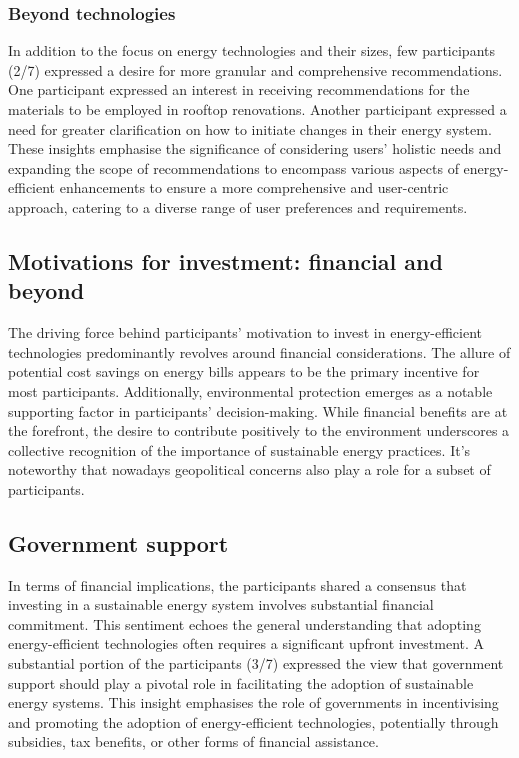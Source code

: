 \subsubsection*{Beyond technologies}

In addition to the focus on energy technologies and their sizes, few participants (2/7) expressed a desire for more granular and comprehensive recommendations. 
One participant expressed an interest in receiving recommendations for the materials to be employed in rooftop renovations. 
Another participant expressed a need for greater clarification on how to initiate changes in their energy system. 
These insights emphasise the significance of considering users' holistic needs and expanding the scope of recommendations to encompass various aspects of energy-efficient enhancements to ensure a more comprehensive and user-centric approach, catering to a diverse range of user preferences and requirements.


\subsection*{Motivations for investment: financial and beyond}

The driving force behind participants' motivation to invest in energy-efficient technologies predominantly revolves around financial considerations. 
The allure of potential cost savings on energy bills appears to be the primary incentive for most participants. 
Additionally, environmental protection emerges as a notable supporting factor in participants' decision-making. 
While financial benefits are at the forefront, the desire to contribute positively to the environment underscores a collective recognition of the importance of sustainable energy practices.
It's noteworthy that nowadays geopolitical concerns also play a role for a subset of participants. 


\subsection*{Government support}

In terms of financial implications, the participants shared a consensus that investing in a sustainable energy system involves substantial financial commitment. 
This sentiment echoes the general understanding that adopting energy-efficient technologies often requires a significant upfront investment.
A substantial portion of the participants (3/7) expressed the view that government support should play a pivotal role in facilitating the adoption of sustainable energy systems.
This insight emphasises the role of governments in incentivising and promoting the adoption of energy-efficient technologies, potentially through subsidies, tax benefits, or other forms of financial assistance. 


